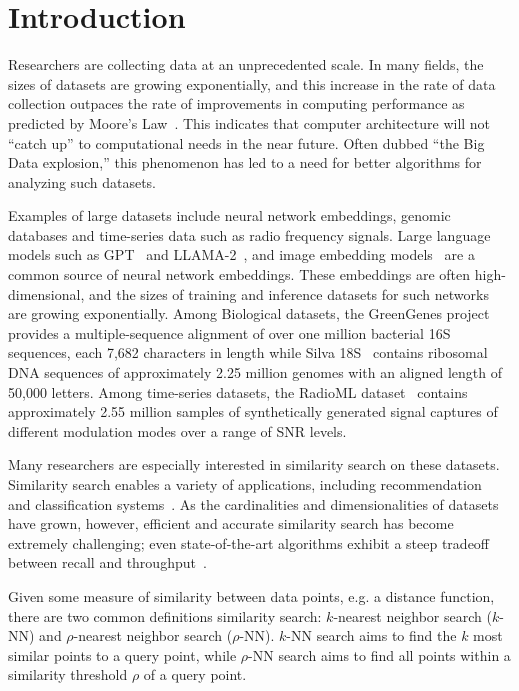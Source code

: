 \section{Introduction}
\label{sec:introduction}

Researchers are collecting data at an unprecedented scale.
In many fields, the sizes of datasets are growing exponentially, and this increase in the rate of data collection outpaces the rate of improvements in computing performance as predicted by Moore's Law~\cite{brescia2012extracting}.
This indicates that computer architecture will not ``catch up'' to computational needs in the near future.
Often dubbed ``the Big Data explosion,'' this phenomenon has led to a need for better algorithms for analyzing such datasets.

Examples of large datasets include neural network embeddings, genomic databases and time-series data such as radio frequency signals.
Large language models such as GPT~\cite{2020arXiv200514165B, OpenAI2023GPT4TR} and LLAMA-2~\cite{Touvron2023Llama2O}, and image embedding models~\cite{radford2021learning, dosovitskiy2020image} are a common source of neural network embeddings.
These embeddings are often high-dimensional, and the sizes of training and inference datasets for such networks are growing exponentially.
Among Biological datasets, the GreenGenes project~\cite{desantis2006greengenes} provides a multiple-sequence alignment of over one million bacterial 16S sequences, each 7,682 characters in length while Silva 18S~\cite{10.1093/nar/gks1219} contains ribosomal DNA sequences of approximately 2.25 million genomes with an aligned length of 50,000 letters.
Among time-series datasets, the RadioML dataset~\cite{oshea2018radioml} contains approximately 2.55 million samples of synthetically generated signal captures of different modulation modes over a range of SNR levels.

Many researchers are especially interested in similarity search on these datasets. 
Similarity search enables a variety of applications, including recommendation~\cite{annoy} and classification systems~\cite{suyanto2022knnclassifier}. 
As the cardinalities and dimensionalities of datasets have grown, however, efficient and accurate similarity search has become extremely challenging; 
even state-of-the-art algorithms exhibit a steep tradeoff between recall and throughput~\cite{Malkov2016EfficientAR, johnson2019billion, annoy, aumuller2020ann}.

Given some measure of similarity between data points, e.g. a distance function, there are two common definitions similarity search: $k$-nearest neighbor search ($k$-NN) and $\rho$-nearest neighbor search ($\rho$-NN).
$k$-NN search aims to find the $k$ most similar points to a query point, while $\rho$-NN search aims to find all points within a similarity threshold $\rho$ of a query point.

